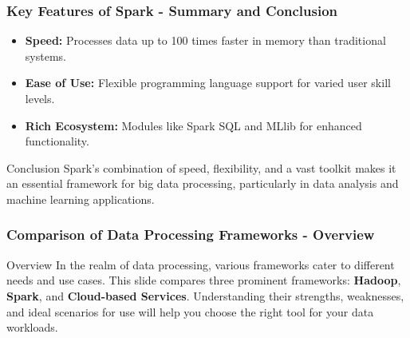 \documentclass[aspectratio=169]{beamer}
\begin{document}
\begin{frame}[fragile]
    \frametitle{Key Features of Spark - Summary and Conclusion}
    \begin{itemize}
        \item \textbf{Speed:} Processes data up to 100 times faster in memory than traditional systems.
        \item \textbf{Ease of Use:} Flexible programming language support for varied user skill levels.
        \item \textbf{Rich Ecosystem:} Modules like Spark SQL and MLlib for enhanced functionality.
    \end{itemize}
    \vspace{1em}
    \begin{block}{Conclusion}
        Spark's combination of speed, flexibility, and a vast toolkit makes it an essential framework for big data processing, particularly in data analysis and machine learning applications.
    \end{block}
\end{frame}

\begin{frame}[fragile]
    \frametitle{Comparison of Data Processing Frameworks - Overview}
    \begin{block}{Overview}
        In the realm of data processing, various frameworks cater to different needs and use cases. This slide compares three prominent frameworks: 
        \textbf{Hadoop}, \textbf{Spark}, and \textbf{Cloud-based Services}. 
        Understanding their strengths, weaknesses, and ideal scenarios for use will help you choose the right tool for your data workloads.
    \end{block}
\end{frame}
\end{document}
